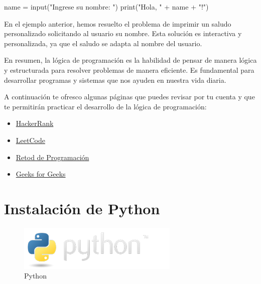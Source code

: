 \documentclass[
  a4paper,
  DIV=11,
  numbers=noendperiod,
  onepage,
  openany]{scrreprt}
\newenvironment{Shaded}{\begin{snugshade}}{\end{snugshade}}
\newcommand{\BuiltInTok}[1]{\textcolor[rgb]{0.00,0.23,0.31}{#1}}
\newcommand{\NormalTok}[1]{\textcolor[rgb]{0.00,0.23,0.31}{#1}}
\newcommand{\OperatorTok}[1]{\textcolor[rgb]{0.37,0.37,0.37}{#1}}
\newcommand{\StringTok}[1]{\textcolor[rgb]{0.13,0.47,0.30}{#1}}
\providecommand{\tightlist}{%
  \setlength{\itemsep}{0pt}\setlength{\parskip}{0pt}}\usepackage{longtable,booktabs,array}
\begin{document}
\begin{Shaded}
\begin{Highlighting}[]
\NormalTok{name }\OperatorTok{=} \BuiltInTok{input}\NormalTok{(}\StringTok{"Ingrese su nombre: "}\NormalTok{)}
\BuiltInTok{print}\NormalTok{(}\StringTok{"Hola, "} \OperatorTok{+}\NormalTok{ name }\OperatorTok{+} \StringTok{"!"}\NormalTok{)}
\end{Highlighting}
\end{Shaded}

En el ejemplo anterior, hemos resuelto el problema de imprimir un saludo
personalizado solicitando al usuario su nombre. Esta solución es
interactiva y personalizada, ya que el saludo se adapta al nombre del
usuario.

En resumen, la lógica de programación es la habilidad de pensar de
manera lógica y estructurada para resolver problemas de manera
eficiente. Es fundamental para desarrollar programas y sistemas que nos
ayuden en nuestra vida diaria.

A continuación te ofresco algunas páginas que puedes revisar por tu
cuenta y que te permitirán practicar el desarrollo de la lógica de
programación:

\begin{itemize}
\tightlist
\item
  \href{https://www.hackerrank.com/}{HackerRank}
\item
  \href{https://leetcode.com/}{LeetCode}
\item
  \href{https://retosdeprogramacion.com}{Retod de Programación}
\item
  \href{https://www.geeksforgeeks.org/}{Geeks for Geeks}
\end{itemize}

\section{Instalación de Python}\label{instalaciuxf3n-de-python}

\begin{figure}[H]

{\centering \includegraphics{index_files/mediabag/python-logo.png}

}

\caption{Python}

\end{figure}%
\end{document}
